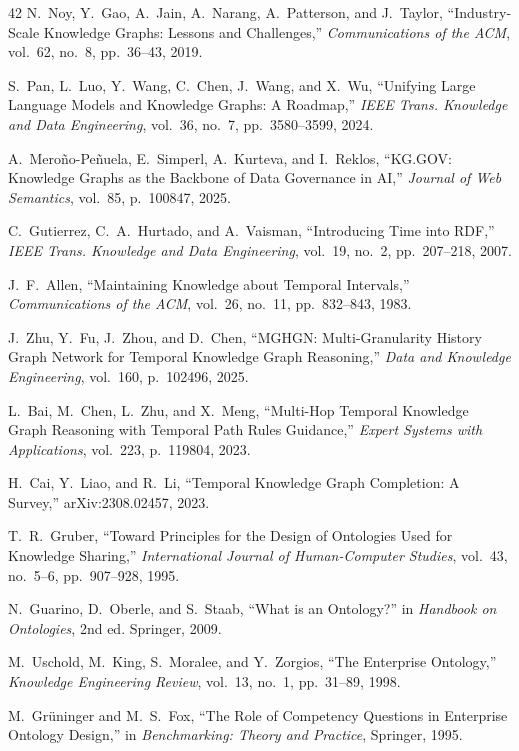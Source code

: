 \documentclass{ieeeaccess}
\begin{document}
\begin{thebibliography}{42}
N.~Noy, Y.~Gao, A.~Jain, A.~Narang, A.~Patterson, and J.~Taylor, ``Industry-Scale Knowledge Graphs: Lessons and Challenges,'' \textit{Communications of the ACM}, vol.~62, no.~8, pp.~36--43, 2019.

S.~Pan, L.~Luo, Y.~Wang, C.~Chen, J.~Wang, and X.~Wu, ``Unifying Large Language Models and Knowledge Graphs: A Roadmap,'' \textit{IEEE Trans. Knowledge and Data Engineering}, vol.~36, no.~7, pp.~3580--3599, 2024.

A.~Mero\~{n}o-Pe\~{n}uela, E.~Simperl, A.~Kurteva, and I.~Reklos, ``KG.GOV: Knowledge Graphs as the Backbone of Data Governance in AI,'' \textit{Journal of Web Semantics}, vol.~85, p.~100847, 2025.

C.~Gutierrez, C.~A.~Hurtado, and A.~Vaisman, ``Introducing Time into RDF,'' \textit{IEEE Trans. Knowledge and Data Engineering}, vol.~19, no.~2, pp.~207--218, 2007.

J.~F.~Allen, ``Maintaining Knowledge about Temporal Intervals,'' \textit{Communications of the ACM}, vol.~26, no.~11, pp.~832--843, 1983.

J.~Zhu, Y.~Fu, J.~Zhou, and D.~Chen, ``MGHGN: Multi-Granularity History Graph Network for Temporal Knowledge Graph Reasoning,'' \textit{Data and Knowledge Engineering}, vol.~160, p.~102496, 2025.

L.~Bai, M.~Chen, L.~Zhu, and X.~Meng, ``Multi-Hop Temporal Knowledge Graph Reasoning with Temporal Path Rules Guidance,'' \textit{Expert Systems with Applications}, vol.~223, p.~119804, 2023.

H.~Cai, Y.~Liao, and R.~Li, ``Temporal Knowledge Graph Completion: A Survey,'' arXiv:2308.02457, 2023.

T.~R.~Gruber, ``Toward Principles for the Design of Ontologies Used for Knowledge Sharing,'' \textit{International Journal of Human-Computer Studies}, vol.~43, no.~5--6, pp.~907--928, 1995.

N.~Guarino, D.~Oberle, and S.~Staab, ``What is an Ontology?'' in \textit{Handbook on Ontologies}, 2nd ed. Springer, 2009.

M.~Uschold, M.~King, S.~Moralee, and Y.~Zorgios, ``The Enterprise Ontology,'' \textit{Knowledge Engineering Review}, vol.~13, no.~1, pp.~31--89, 1998.

M.~Gr\"{u}ninger and M.~S.~Fox, ``The Role of Competency Questions in Enterprise Ontology Design,'' in \textit{Benchmarking: Theory and Practice}, Springer, 1995.


\end{thebibliography}
\end{document}
